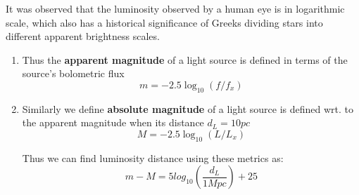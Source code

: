 \begin{frame}
	It was observed that the luminosity observed by a human eye is in
	logarithmic scale, which also has a historical significance of Greeks
	dividing stars into different apparent brightness scales.

	\begin{enumerate}
		\item Thus the
			\textbf{apparent magnitude} of a light source is defined in terms of the source's
	bolometric flux
	$$ m = -2.5 \log_{10}(f/f_x) $$

\item Similarly we define \textbf{absolute magnitude} of a light source is
	defined wrt. to the apparent magnitude when its distance $d_L = 10 pc$
	$$ M = -2.5 \log_{10}(L/L_x) $$

	Thus we can find luminosity distance using these metrics as:
	$$ m - M = 5 log_{10} \left( \frac{d_L}{1 Mpc} \right) + 25$$

        \end{enumerate}
\end{frame}
